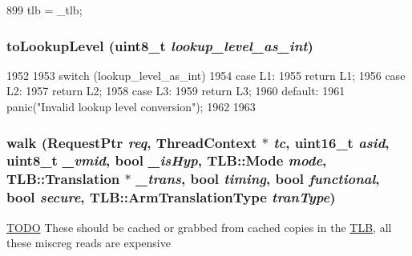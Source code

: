 \begin{DoxyCode}
899 { tlb = _tlb; }
\end{DoxyCode}
\hypertarget{classArmISA_1_1TableWalker_aea45aff83099165fcb29b3c3df3de9c2}{
\subsubsection[{toLookupLevel}]{ toLookupLevel (uint8\_\-t {\em lookup\_\-level\_\-as\_\-int})}}
\label{classArmISA_1_1TableWalker_aea45aff83099165fcb29b3c3df3de9c2}



\begin{DoxyCode}
1952 {
1953     switch (lookup_level_as_int) {
1954       case L1:
1955         return L1;
1956       case L2:
1957         return L2;
1958       case L3:
1959         return L3;
1960       default:
1961         panic("Invalid lookup level conversion");
1962     }
1963 }
\end{DoxyCode}
\hypertarget{classArmISA_1_1TableWalker_ae5ef435aac9ac661f33937b2254718b1}{
\subsubsection[{walk}]{ walk ({\bf RequestPtr} {\em req}, \/  {\bf ThreadContext} $\ast$ {\em tc}, \/  uint16\_\-t {\em asid}, \/  uint8\_\-t {\em \_\-vmid}, \/  bool {\em \_\-isHyp}, \/  {\bf TLB::Mode} {\em mode}, \/  {\bf TLB::Translation} $\ast$ {\em \_\-trans}, \/  bool {\em timing}, \/  bool {\em functional}, \/  bool {\em secure}, \/  {\bf TLB::ArmTranslationType} {\em tranType})}}
\label{classArmISA_1_1TableWalker_ae5ef435aac9ac661f33937b2254718b1}


\begin{Desc}
\item[\hyperlink{todo__todo000002}{TODO}]These should be cached or grabbed from cached copies in the \hyperlink{classArmISA_1_1TLB}{TLB}, all these miscreg reads are expensive \end{Desc}



